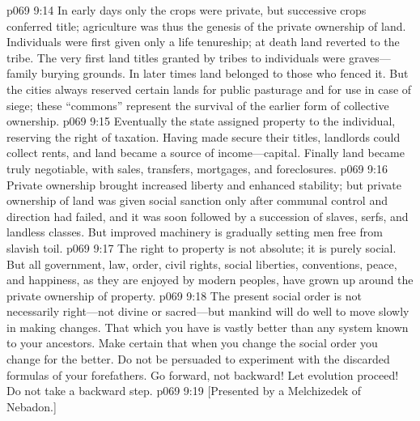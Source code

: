 \vs p069 9:14 In early days only the crops were private, but successive crops conferred title; agriculture was thus the genesis of the private ownership of land. Individuals were first given only a life tenureship; at death land reverted to the tribe. The very first land titles granted by tribes to individuals were graves---family burying grounds. In later times land belonged to those who fenced it. But the cities always reserved certain lands for public pasturage and for use in case of siege; these “commons” represent the survival of the earlier form of collective ownership.
\vs p069 9:15 Eventually the state assigned property to the individual, reserving the right of taxation. Having made secure their titles, landlords could collect rents, and land became a source of income---capital. Finally land became truly negotiable, with sales, transfers, mortgages, and foreclosures.
\vs p069 9:16 Private ownership brought increased liberty and enhanced stability; but private ownership of land was given social sanction only after communal control and direction had failed, and it was soon followed by a succession of slaves, serfs, and landless classes. But improved machinery is gradually setting men free from slavish toil.
\vs p069 9:17 The right to property is not absolute; it is purely social. But all government, law, order, civil rights, social liberties, conventions, peace, and happiness, as they are enjoyed by modern peoples, have grown up around the private ownership of property.\plusone
\vs p069 9:18 The present social order is not necessarily right---not divine or sacred---but mankind will do well to move slowly in making changes. That which you have is vastly better than any system known to your ancestors. Make certain that when you change the social order you change for the better. Do not be persuaded to experiment with the discarded formulas of your forefathers. Go forward, not backward! Let evolution proceed! Do not take a backward step.
\vsetoff
\vs p069 9:19 [Presented by a Melchizedek of Nebadon.]
